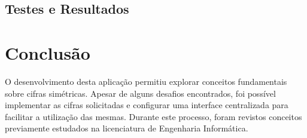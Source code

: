 \documentclass[a4paper]{article}
\begin{document}
\subsection{Testes e Resultados}

\newpage
\section{Conclusão}\label{con}
O desenvolvimento desta aplicação permitiu explorar conceitos fundamentais sobre cifras simétricas.
Apesar de alguns desafios encontrados, foi possível implementar as
cifras solicitadas e configurar uma interface centralizada para facilitar a utilização das mesmas.
Durante este processo, foram revistos conceitos previamente estudados na licenciatura de Engenharia Informática.

\newpage
\renewcommand{\refname}{Bibliografia} %
\renewcommand{\bibname}{Bibliografia} %
\printbibliography
\end{document}
